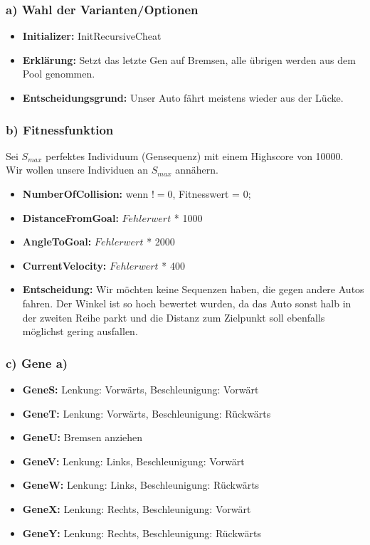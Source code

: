 \documentclass{beamer}
\begin{document}
\begin{frame}
  \frametitle{\textbf{a)} Wahl der Varianten/Optionen}
  \begin{itemize}
    \item \textbf{Initializer:} InitRecursiveCheat 
    \item \textbf{Erklärung:} Setzt das letzte Gen auf Bremsen, alle übrigen werden aus dem Pool genommen.
    \item \textbf{Entscheidungsgrund:} Unser Auto fährt meistens wieder aus der Lücke.
   
   
  \end{itemize}
\end{frame}

\begin{frame}
  \frametitle{\textbf{b)} Fitnessfunktion}

  Sei $S_{max}$ perfektes Individuum (Gensequenz) mit einem Highscore von 10000. \\

  Wir wollen unsere Individuen an $S_{max}$ annähern.
 \begin{itemize}
    \item \textbf{NumberOfCollision:} wenn $ != 0 $, Fitnesswert = 0;
    \item \textbf{DistanceFromGoal:} $Fehlerwert$ * 1000
    \item \textbf{AngleToGoal:} $Fehlerwert$ * 2000
    \item \textbf{CurrentVelocity:} $Fehlerwert$ * 400
    \item \textbf{Entscheidung:} Wir möchten keine Sequenzen haben, die gegen andere Autos fahren. Der Winkel ist so hoch bewertet wurden, da das Auto sonst halb in der zweiten Reihe parkt und die Distanz zum Zielpunkt soll ebenfalls möglichst gering ausfallen.
   
   
  \end{itemize}
\end{frame}
\begin{frame}
  \frametitle{\textbf{c)} Gene a)}
  \begin{itemize}
    \item \textbf{GeneS:} Lenkung: Vorwärts, Beschleunigung: Vorwärt
    \item \textbf{GeneT:} Lenkung: Vorwärts, Beschleunigung: Rückwärts
    \item \textbf{GeneU:} Bremsen anziehen
    \item \textbf{GeneV:} Lenkung: Links, Beschleunigung: Vorwärt
    \item \textbf{GeneW:} Lenkung: Links, Beschleunigung: Rückwärts
    \item \textbf{GeneX:} Lenkung: Rechts, Beschleunigung: Vorwärt
    \item \textbf{GeneY:} Lenkung: Rechts, Beschleunigung: Rückwärts
  
  \end{itemize}
\end{frame}
\end{document}
